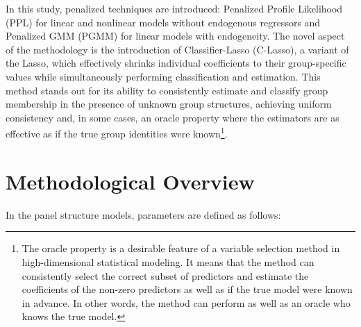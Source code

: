 \documentclass[UTF8,a4paper,10pt]{article}
\begin{document}
In this study, penalized techniques are introduced: Penalized Profile Likelihood (PPL) for linear and nonlinear models without endogenous regressors and Penalized GMM (PGMM) for linear models with endogeneity. 
The novel aspect of the methodology is the introduction of Classifier-Lasso (C-Lasso), a variant of the Lasso, which effectively shrinks individual coefficients to their group-specific values while simultaneously performing classification and estimation. This method stands out for its ability to consistently estimate and classify group membership in the presence of unknown group structures, achieving uniform consistency and, in some cases, an oracle property where the estimators are as effective as if the true group identities were known\footnote{The oracle property is a desirable feature of a variable selection method in high-dimensional statistical modeling. It means that the method can consistently select the correct subset of predictors and estimate the coefficients of the non-zero predictors as well as if the true model were known in advance. In other words, the method can perform as well as an oracle who knows the true model.\cite[See][]{Fan2001,Hardy2017}}.



\section{Methodological Overview}



In the panel structure models, parameters are defined as follows:
\end{document}
